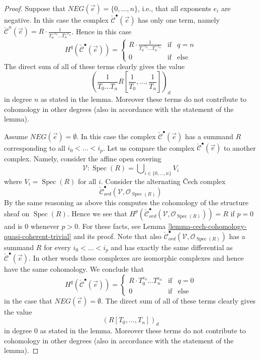 \documentclass{stacks-project}
\theoremstyle{plain}
\theoremstyle{definition}
\theoremstyle{remark}
\numberwithin{equation}{subsection}
\def\Spec{\mathop{\mathrm{Spec}}}
\begin{document}
\begin{proof}
\medskip\noindent
Suppose that $NEG(\vec{e}) = \{0, \ldots, n\}$, i.e., that all
exponents $e_i$ are negative.
In this case the complex $\check{\mathcal{C}}^\bullet(\vec{e})$ has
only one term, namely $\check{\mathcal{C}}^n(\vec{e}) =
R \cdot \frac{1}{T_0^{-e_0} \ldots T_n^{-e_n}}$. Hence in this
case
$$
H^q(\check{\mathcal{C}}^\bullet(\vec{e})) =
\left\{
\begin{matrix}
R \cdot \frac{1}{T_0^{-e_0} \ldots T_n^{-e_n}} & \text{if} & q = n \\
0 & \text{if} & \text{else}
\end{matrix}
\right.
$$
The direct sum of all of these terms clearly gives the value
$$
\left(\frac{1}{T_0 \ldots T_n} R[\frac{1}{T_0}, \ldots, \frac{1}{T_n}]\right)_d
$$
in degree $n$ as stated in the lemma. Moreover these terms do not contribute
to cohomology in other degrees (also in accordance with the statement of the
lemma).

\medskip\noindent
Assume $NEG(\vec{e}) = \emptyset$. In this case the complex
$\check{\mathcal{C}}^\bullet(\vec{e})$ has a summand $R$ corresponding
to all $i_0 < \ldots < i_p$.
Let us compare the complex $\check{\mathcal{C}}^\bullet(\vec{e})$
to another complex. Namely, consider the affine open covering
$$
\mathcal{V} : \Spec(R) = \bigcup\nolimits_{i \in \{0, \ldots, n\}} V_i
$$
where $V_i = \Spec(R)$ for all $i$. Consider the alternating
{\v C}ech complex
$$
\check{\mathcal{C}}_{ord}^\bullet(\mathcal{V}, \mathcal{O}_{\Spec(R)})
$$
By the same reasoning as above this computes the cohomology of the
structure sheaf on $\Spec(R)$. Hence we see that
$H^p(
\check{\mathcal{C}}_{ord}^\bullet(\mathcal{V}, \mathcal{O}_{\Spec(R)})
) = R$ if $p = 0$ and is $0$ whenever $p > 0$.
For these facts, see
Lemma \ref{lemma-cech-cohomology-quasi-coherent-trivial} and its proof.
Note that also
$\check{\mathcal{C}}_{ord}^\bullet(\mathcal{V}, \mathcal{O}_{\Spec(R)})$
has a summand $R$ for every $i_0 < \ldots < i_p$ and has exactly the same
differential as $\check{\mathcal{C}}^\bullet(\vec{e})$. In other words
these complexes are isomorphic complexes and hence have the same cohomology.
We conclude that
$$
H^q(\check{\mathcal{C}}^\bullet(\vec{e})) =
\left\{
\begin{matrix}
R \cdot T_0^{e_0} \ldots T_n^{e_n} & \text{if} & q = 0 \\
0 & \text{if} & \text{else}
\end{matrix}
\right.
$$
in the case that $NEG(\vec{e}) = \emptyset$.
The direct sum of all of these terms clearly gives the value
$$
(R[T_0, \ldots, T_n])_d
$$
in degree $0$ as stated in the lemma. Moreover these terms do not contribute
to cohomology in other degrees (also in accordance with the statement of the
lemma).


\end{proof}
\end{document}
